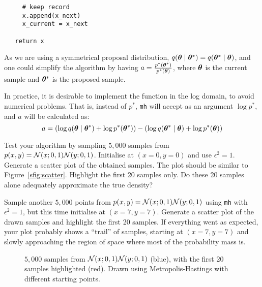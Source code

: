 \begin{exenumerate}
\begin{solution}
\begin{lstlisting}
     # keep record
     x.append(x_next)
     x_current = x_next
	
   return x
\end{lstlisting}
%
As we are using a symmetrical proposal distribution, $q(\boldsymbol{\theta} \mid \boldsymbol{\theta}^*) = q(\boldsymbol{\theta}^* \mid \boldsymbol{\theta})$, and one could simplify the algorithm by having $a = \frac{p^*(\boldsymbol{\theta}^*)}{p^*(\boldsymbol{\theta})}$, where $\boldsymbol{\theta}$ is the current sample and $\boldsymbol{\theta}^*$ is the proposed sample.

In practice, it is desirable to implement the function in the log domain, to avoid numerical problems. That is, instead of $p^*$, \lstinline|mh| will accept as an argument $\log p^*$, and $a$ will be calculated as: 
$$a = (\log q(\boldsymbol{\theta} \mid \boldsymbol{\theta}^*) + \log p^*(\boldsymbol{\theta}^*)) - (\log q(\boldsymbol{\theta}^* \mid \boldsymbol{\theta}) + \log p^*(\boldsymbol{\theta}))$$
\end{solution}

\item \label{qpt:mh_test} Test your algorithm by sampling $5,000$
  samples from $p(x, y) = \mathcal{N}(x; 0, 1)\mathcal{N}(y; 0,
  1)$. Initialise at $(x=0, y=0)$ and use $\epsilon^2=1$.
%
Generate a scatter plot of the obtained samples. The plot should be
similar to Figure~\ref{sfig:scatter}. Highlight the first 20 samples
only. Do these 20 samples alone adequately approximate the true
density?

Sample another $5,000$ points from $p(x, y) = \mathcal{N}(x; 0,
1)\mathcal{N}(y; 0, 1)$ using \lstinline|mh| with $\epsilon^2=1$, but this
time initialise at $(x=7,y=7)$. Generate a scatter plot of the drawn
samples and highlight the first 20 samples. If everything went as
expected, your plot probably shows a ``trail'' of samples, starting at
$(x=7, y=7)$ and slowly approaching the region of space where most of
the probability mass is.


\begin{solution}

  \begin{figure}[!h]
    \captionsetup{type=figure}%
    \centering
    \caption{\label{fig:initial} $5,000$ samples from $\mathcal{N}(x; 0, 1)\mathcal{N}(y; 0, 1)$ (blue), with the first $20$ samples highlighted (red). Drawn using Metropolis-Hastings with different starting points.}
  \end{figure}



\end{solution}
\end{exenumerate}
